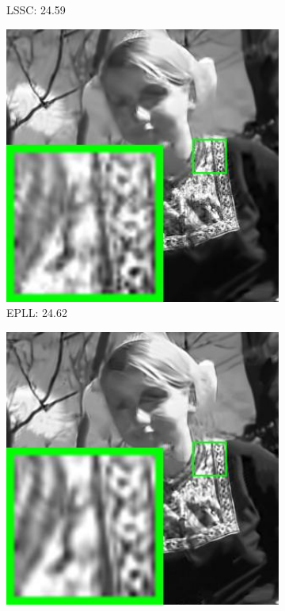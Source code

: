 \begin{figure}
\begin{subfigure}[t]{0.24\textwidth}
		\caption{LSSC: 24.59}
    \end{subfigure}
    \hfill
    \begin{subfigure}[t]{0.24\textwidth}
        \centering
        \includegraphics[width=1\textwidth]{images/pgpd/200img/br_NCSR_50_258089.jpg}
		\caption{EPLL: 24.62}
    \end{subfigure}
    \hfill
    \begin{subfigure}[t]{0.24\textwidth}
        \centering
        \includegraphics[width=1\textwidth]{images/pgpd/200img/br_WNNM_50_258089.jpg}

\end{subfigure}
\end{figure}
